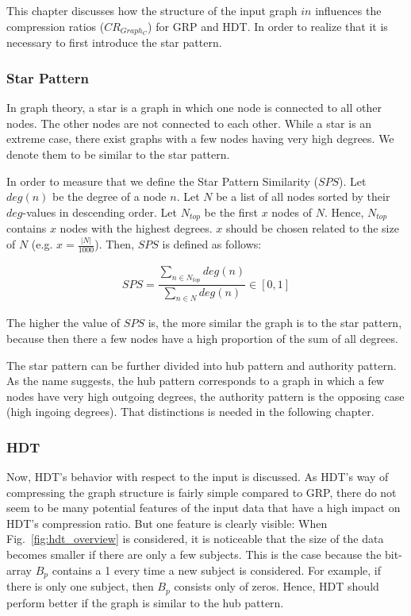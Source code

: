 This chapter discusses how the structure of the input graph $in$ influences the compression ratios ($CR_{Graph_C}$) for GRP and HDT. In order to realize that it is necessary to first introduce the star pattern.

\subsubsection{Star Pattern}

In graph theory, a star is a graph in which one node is connected to all other nodes. The other nodes are not connected to each other. While a star is an extreme case, there exist graphs with a few nodes having very high degrees. We denote them to be similar to the star pattern. 

In order to measure that we define the Star Pattern Similarity ($SPS$). Let $deg(n)$ be the degree of a node $n$. Let $N$ be a list of all nodes sorted by their $deg$-values in descending order.  Let $N_{top}$ be the first $x$ nodes of $N$. Hence, $N_{top}$ contains $x$ nodes with the highest degrees. $x$ should be chosen related to the size of $N$ (e.g. $x=\frac{|N|}{1000}$).  Then, $SPS$ is defined as follows:

\begin{align*}
SPS=\dfrac{\sum_{n \in N_{top}} deg(n)  }{\sum_{n \in N} deg(n)} \in [0,1]
\end{align*}

The higher the value of $SPS$ is, the more similar the graph is to the star pattern, because then there a few nodes have a high proportion of the sum of all degrees.

The star pattern can be further divided into hub pattern and authority pattern. As the name suggests, the hub pattern corresponds to a graph in which a few nodes have very high outgoing degrees, the authority pattern is the opposing case (high ingoing degrees). That distinctions is needed in the following chapter.

\subsubsection{HDT}

Now, HDT's behavior with respect to the input is discussed. As HDT's way of compressing the graph structure is fairly simple compared to GRP, there do not seem to be many potential features of the input data that have a high impact on HDT's compression ratio. But one feature is clearly visible: When Fig.~\ref{fig:hdt_overview} is considered, it is noticeable that the size of the data becomes smaller if there are only a few subjects. This is the case because the bit-array $B_p$ contains a 1 every time a new subject is considered. For example, if there is only one subject, then $B_p$ consists only of zeros. Hence, HDT should perform better if the graph is similar to the hub pattern.

